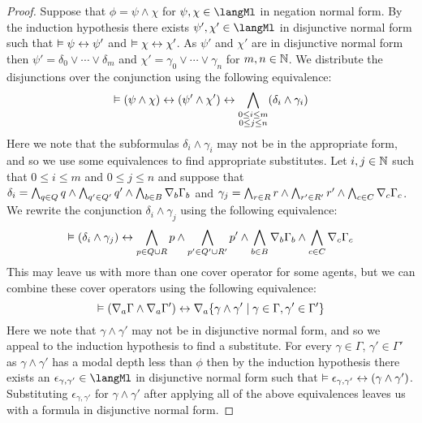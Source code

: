 \begin{proof}
Suppose that $\phi = \psi \land \chi$ for $\psi, \chi \in \langMl$ in negation normal form.
By the induction hypothesis there exists $\psi', \chi' \in \langMl$ in disjunctive normal form such that $\vDash \psi \leftrightarrow \psi'$ and $\vDash \chi \leftrightarrow \chi'$.
As $\psi'$ and $\chi'$ are in disjunctive normal form then $\psi' = \delta_0 \lor \cdots \lor \delta_m$ and $\chi' = \gamma_0 \lor \cdots \lor \gamma_n$ for $m, n \in \mathbb{N}$.
We distribute the disjunctions over the conjunction using the following equivalence:
$$
\vDash (\psi \land \chi) \leftrightarrow (\psi' \land \chi') \leftrightarrow \bigwedge_{\substack{0 \leq i \leq m\\0 \leq j \leq n}} (\delta_i \land \gamma_i)
$$
Here we note that the subformulas $\delta_i \land \gamma_i$ may not be in the appropriate form, and so we use some equivalences to find appropriate substitutes. 
Let $i, j \in \mathbb{N}$ such that $0 \leq i \leq m$ and $0 \leq j \leq n$ and suppose that $\delta_i = \bigwedge_{q \in Q} q \land \bigwedge_{q' \in Q'} q' \land \bigwedge_{b \in B} \nabla_{b} \Gamma_b$ and $\gamma_j = \bigwedge_{r \in R} r \land \bigwedge_{r' \in R'} r' \land \bigwedge_{c \in C} \nabla_{c} \Gamma_c$.
We rewrite the conjunction $\delta_i \land \gamma_j$ using the following equivalence:
$$
\vDash (\delta_i \land \gamma_j) \leftrightarrow 
\bigwedge_{p \in Q \cup R} p \land \bigwedge_{p' \in Q' \cup R'} p' \land \bigwedge_{b \in B} \nabla_{b} \Gamma_b \land \bigwedge_{c \in C} \nabla_{c} \Gamma_c
$$
This may leave us with more than one cover operator for some agents, but we can combine these cover operators using the following equivalence:
$$
\vDash (\nabla_{a} \Gamma \land \nabla_{a} \Gamma') \leftrightarrow \nabla_{a} \{\gamma \land \gamma' \mid \gamma \in \Gamma, \gamma' \in \Gamma'\}
$$
Here we note that $\gamma \land \gamma'$ may not be in disjunctive normal form, and so we appeal to the induction hypothesis to find a substitute.
For every $\gamma \in \Gamma$, $\gamma' \in \Gamma'$ as $\gamma \land \gamma'$ has a modal depth less than $\phi$ then by the induction hypothesis there exists an $\epsilon_{\gamma,\gamma'} \in \langMl$ in disjunctive normal form such that $\vDash \epsilon_{\gamma,\gamma'} \leftrightarrow (\gamma \land \gamma')$.
Substituting $\epsilon_{\gamma,\gamma'}$ for $\gamma \land \gamma'$ after applying all of the above equivalences leaves us with a formula in disjunctive normal form.
\end{proof}

